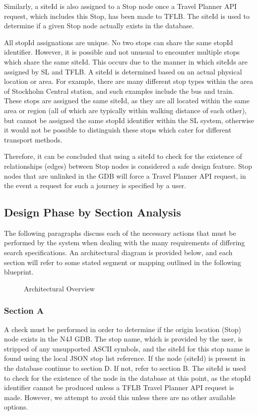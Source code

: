 \documentclass[12pt]{article}   	%
\begin{document}
Similarly, a siteId is also assigned to a Stop node once a Travel Planner API request, which includes this Stop, has been made to TFLB. The siteId is used to determine if a given Stop node actually exists in the database.

All stopId assignations are unique. No two stops can share the same stopId identifier. However, it is possible and not unusual to encounter multiple stops which share the same siteId. This occurs due to the manner in which siteIds are assigned by SL and TFLB. A siteId is determined based on an actual physical location or area. For example, there are many different stop types within the area of Stockholm Central station, and such examples include the bus and train. These stops are assigned the same siteId, as they are all located within the same area or region (all of which are typically within walking distance of each other), but cannot be assigned the same stopId identifier within the SL system, otherwise it would not be possible to distinguish these stops which cater for different transport methods.

Therefore, it can be concluded that using a siteId to check for the existence of relationships (edges) between Stop nodes is considered a safe design feature. Stop nodes that are unlinked in the GDB will force a Travel Planner API request, in the event a request for such a journey is specified by a user.

\noindent
\subsection{Design Phase by Section Analysis}
\noindent

\noindent
The following paragraphs discuss each of the necessary actions that must be performed by the system when dealing with the many requirements of differing search specifications. An architectural diagram is provided below, and each section will refer to some stated segment or mapping outlined in the following blueprint.

\begin{figure}[htp]

\caption{Architectural Overview}
\end{figure}

\newpage

\subsubsection{Section A}
A check must be performed in order to determine if the origin location (Stop) node exists in the N4J GDB. The stop name, which is provided by the user, is stripped of any unsupported ASCII symbols, and the siteId for this stop name is found using the local JSON stop list reference. If the node (siteId) is present in the database continue to section D. If not, refer to section B. The siteId is used to check for the existence of the node in the database at this point, as the stopId identifier cannot be produced unless a TFLB Travel Planner API request is made. However, we attempt to avoid this unless there are no other available options.
\end{document}
